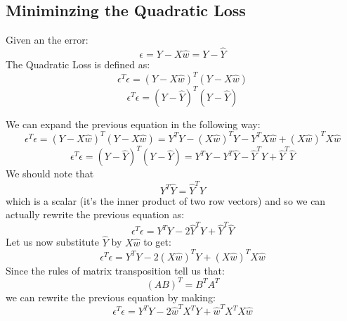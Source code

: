 \subsection{Miniminzing the Quadratic Loss}
Given an the error:
\begin{equation}
\epsilon = Y - X \hat{w} = Y - \hat{Y}
\end{equation}
The Quadratic Loss is defined as:
\begin{equation}
\epsilon^T \epsilon = (Y - X \hat{w})^{T}(Y - X \hat{w})
\end{equation}
\begin{equation}
\epsilon^T \epsilon = (Y - \hat{Y})^{T}(Y - \hat{Y})
\end{equation}

We can expand the previous equation in the following way:
\begin{equation}
\epsilon^T \epsilon = (Y - X \hat{w})^{T}(Y - X \hat{w}) = Y^{T}Y -  (X \hat{w})^{T} Y - Y^{T} X\hat{w} + (X\hat{w})^T X \hat{w}
\end{equation}
\begin{equation}
\epsilon^T \epsilon = (Y - \hat{Y})^{T}(Y - \hat{Y}) = Y^{T}Y - Y^{T}\hat{Y} - \hat{Y}^T Y + \hat{Y}^T \hat{Y}
\end{equation}
We should note that 
\begin{equation}
Y^{T}\hat{Y} = \hat{Y}^T Y 
\end{equation}
which is a scalar (it's the inner product of two row vectors) and so we can actually rewrite the previous equation as:
\begin{equation}
\epsilon^T \epsilon = Y^{T}Y - 2 \hat{Y}^T Y + \hat{Y}^T \hat{Y}
\end{equation}
Let us now substitute $\hat{Y}$ by $X \hat{w}$ to get:
\begin{equation}
\epsilon^T \epsilon = Y^{T}Y -  2 (X \hat{w})^{T} Y + (X\hat{w})^T X \hat{w}
\end{equation}
Since the rules of matrix transposition tell us that:
\begin{equation}
(AB)^T = B^TA^T
\end{equation}
we can rewrite the previous equation by making:
\begin{equation}
\epsilon^T \epsilon = Y^{T}Y - 2 \hat{w}^TX^TY + \hat{w}^TX^T X \hat{w}
\label{eq.squared_loss_ols_explicit}
\end{equation}

